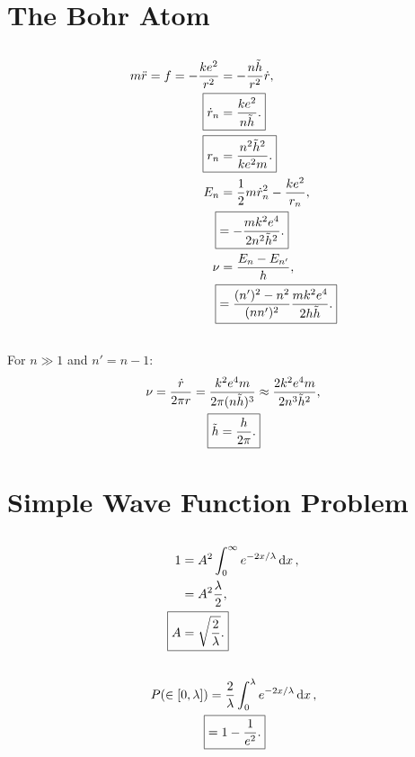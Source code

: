 \documentclass[
a4paper,
10pt,
twoside,
]{article}
\begin{document}
\titleinf
\maketitle
\startmcols

\section{The Bohr Atom}
\subsection{}%
\begin{align}
	m\ddot{r} = f = -\frac{k e^2}{r^2} &= -\frac{n\tilde{h}}{r^2}\dot{r},\\
	\Aboxed{\dot{r}_n &= \frac{k e^2}{n\tilde{h}}.}\\
	\Aboxed{r_n &= \frac{n^2 \tilde{h}^2}{k e^2 m}.}\\
	E_n &= \frac{1}{2} m \dot{r}_n^2 - \frac{k e^2}{r_n},\\
	\Aboxed{&= -\frac{mk^2e^4}{2n^2\tilde{h}^2}.}\\
	\nu &= \frac{E_n-E_{n'}}{h},\\
	\Aboxed{&= \frac{(n')^2-n^2}{(nn')^2} \frac{mk^2e^4}{2h\tilde{h}}.}
\end{align}
\subsection{}%
For $n\gg 1$ and $n' = n-1$:
\begin{align}
	\nu = \frac{\dot{r}}{2\pi r} = \frac{k^2 e^4 m}{2\pi (n\tilde{h})^3} &\approx \frac{2 k^2 e^4 m}{2 n^3\tilde{h}^2},\\
	\Aboxed{\tilde{h} = \frac{h}{2\pi}.}
\end{align}

\section{Simple Wave Function Problem}
\subsection{}%
\begin{align}
	1 &= A^2 \int_0^\infty e^{-2x/\lambda} \dd{x},\\
	&= A^2 \frac{\lambda}{2},\\
	\Aboxed{A &= \sqrt{\frac{2}{\lambda}}.}
\end{align}
\subsection{}%
\begin{align}
	P(\in[0,\lambda])&= \frac{2}{\lambda} \int_0^\lambda e^{-2x/\lambda} \dd{x},\\
	\Aboxed{&=1-\frac{1}{e^2}.}
\end{align}
\end{document}
